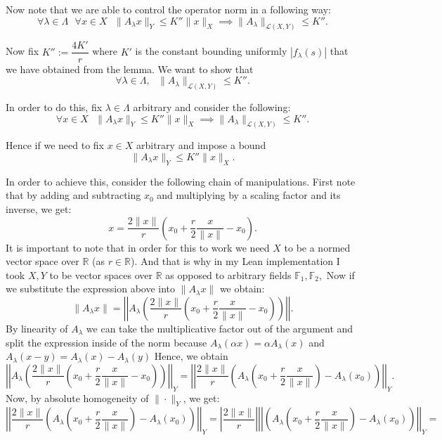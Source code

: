 \documentclass[11pt]{article}
\newcommand\R{\mathbb{R}}
\newcommand\sep{\text{ }}
\begin{document}
 Now note that we are able to control the operator norm in a following way:
 \[
   \forall \lambda \in \Lambda \sep \forall x \in X \sep \|A_\lambda x\|_Y \le K'' \|x\|_X \implies \|A_\lambda\|_{\mathcal{L}\left( X, Y\right)} \le K''
 .\]

 Now fix $K'' := \dfrac{4K'}{r}$ where $K'$ is the constant bounding uniformly $|f_\lambda(s)|$
 that we have obtained from the lemma. We want to show that
 \[
   \forall \lambda \in \Lambda, \sep \|A_\lambda\|_{\mathcal{L}\left( X,Y \right)} \le K''
 .\]

 In order to do this, fix $\lambda \in \Lambda$ arbitrary and consider the following:
\[
   \forall x \in X \sep \|A_\lambda x\|_Y \le K'' \|x\|_X \implies \|A_\lambda\|_{\mathcal{L}\left( X, Y\right)} \le K''
.\]

Hence if we need to fix $x \in X$ arbitrary and impose a bound
\[
\|A_\lambda x\|_Y \le K'' \|x\|_X
.\]

In order to achieve this, consider the following chain of manipulations.
First note that by adding and subtracting $x_0$ and multiplying by a scaling factor
and its inverse, we get:
 \[
x = \frac{2\|x\|}{r}\left( x_0 + \frac{r}{2}\frac{x}{\|x\|} - x_0 \right)
.\]
It is important to note that in order for this to work we need $X$ to be a normed
vector space over $\R$ (as  $r \in \R$). And that is why in my Lean implementation
I took $X, Y$ to be vector spaces over  $\R$ as opposed to arbitrary fields  $\mathbb{F}_1, \mathbb{F}_2,$
Now if we substitute the expression above into $\|A_\lambda x\|$ we obtain:
\[
\|A_\lambda x\| = \left|\left|A_\lambda\left(\frac{2\|x\|}{r}\left( x_0 + \frac{r}{2}\frac{x}{\|x\|} - x_0 \right)  \right) \right|\right|
.\]
By linearity of $A_\lambda$ we can take the multiplicative factor out of the argument
and split the expression inside of the norm because $A_\lambda\left( \alpha x \right) = \alpha A_\lambda\left( x \right)  $ and
$A_\lambda\left( x - y \right) = A_\lambda\left( x \right)  - A_\lambda\left( y \right)  $
Hence, we obtain
\[
\left|\left|A_\lambda\left(\frac{2\|x\|}{r}\left( x_0 + \frac{r}{2}\frac{x}{\|x\|} - x_0 \right)  \right) \right|\right|_Y =
\left|\left| \frac{2\|x\|}{r} \left( A_\lambda\left( x_0 + \frac{r}{2}\frac{x}{\|x\|} \right) - A_\lambda(x_0)  \right) \right|\right|_Y
.\]
Now, by absolute homogeneity of $\|\cdot\|_Y$, we get:
\[
\left|\left| \frac{2\|x\|}{r} \left( A_\lambda\left( x_0 + \frac{r}{2}\frac{x}{\|x\|} \right) - A_\lambda(x_0)  \right) \right|\right|_Y =
\left| \frac{2\|x\|}{r} \right| \left|\left| \left( A_\lambda\left( x_0 + \frac{r}{2}\frac{x}{\|x\|} \right) - A_\lambda(x_0)  \right) \right|\right|_Y =
\]
\end{document}
